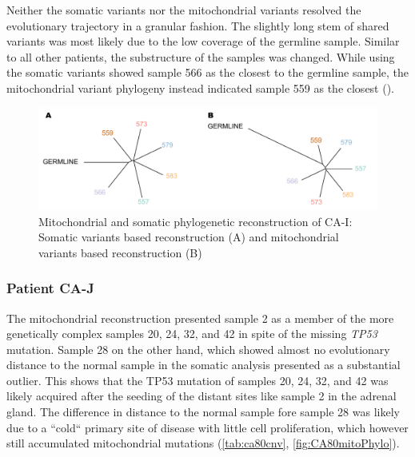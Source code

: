 Neither the somatic variants nor the mitochondrial variants resolved the evolutionary trajectory in a granular fashion. The slightly long stem of shared variants was most likely due to the low coverage of the germline sample. Similar to all other patients, the substructure of the samples was changed. While using the somatic variants showed sample 566 as the closest to the germline sample, the mitochondrial variant phylogeny instead indicated sample 559 as the closest ().


\begin{figure}[ht]
\centering
\includegraphics[width=.99\linewidth]{Figures/CASCADE/mito/CA51SomVsMitoPhylo.pdf}
\caption[Mitochondrial and somatic phylogenetic reconstruction of CA-I]{Mitochondrial and somatic phylogenetic reconstruction of CA-I: Somatic variants based reconstruction (A) and mitochondrial variants based reconstruction (B)} \label{fig:CA51mitoPhylo}
\end{figure}


\subsubsection{Patient CA-J}

The mitochondrial reconstruction presented sample 2 as a member of the more genetically complex samples 20, 24, 32, and 42 in spite of the missing \textit{TP53} mutation. Sample 28 on the other hand, which showed almost no evolutionary distance to the normal sample in the somatic analysis presented as a substantial outlier. This shows that the TP53 mutation of samples 20, 24, 32, and 42 was likely acquired after the seeding of the distant sites like sample 2 in the adrenal gland. The difference in distance to the normal sample fore sample 28 was likely due to a ``cold`` primary site of disease with little cell proliferation, which however still accumulated mitochondrial mutations \cite{Abascal2021} (\autoref{tab:ca80cnv}, \autoref{fig:CA80mitoPhylo}).

